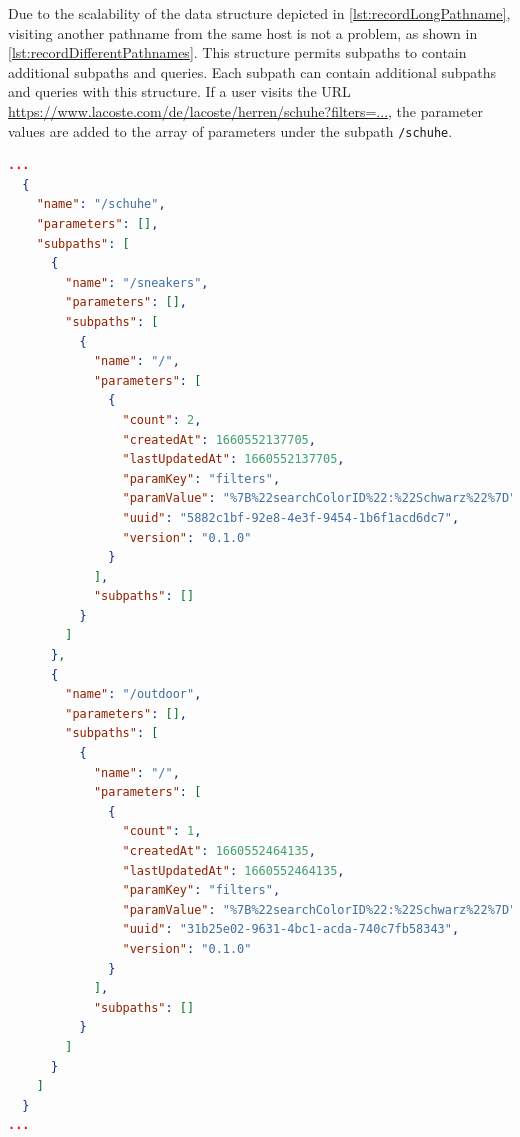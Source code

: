 Due to the scalability of the data structure depicted in \autoref{lst:recordLongPathname}, visiting another pathname from the same host is not a problem, as shown in \autoref{lst:recordDifferentPathnames}. This structure permits subpaths to contain additional subpaths and queries. Each subpath can contain additional subpaths and queries with this structure. If a user visits the URL \url{https://www.lacoste.com/de/lacoste/herren/schuhe?filters=...}, the parameter values are added to the array of parameters under the subpath \texttt{/schuhe}.

\begin{lstlisting}[language=json, caption={Record with different path names (JSON)}, label={lst:recordDifferentPathnames}]
...
  {
    "name": "/schuhe",
    "parameters": [],
    "subpaths": [
      {
        "name": "/sneakers",
        "parameters": [],
        "subpaths": [
          {
            "name": "/",
            "parameters": [
              {
                "count": 2,
                "createdAt": 1660552137705,
                "lastUpdatedAt": 1660552137705,
                "paramKey": "filters",
                "paramValue": "%7B%22searchColorID%22:%22Schwarz%22%7D",
                "uuid": "5882c1bf-92e8-4e3f-9454-1b6f1acd6dc7",
                "version": "0.1.0"
              }
            ],
            "subpaths": []
          }
        ]
      },
      {
        "name": "/outdoor",
        "parameters": [],
        "subpaths": [
          {
            "name": "/",
            "parameters": [
              {
                "count": 1,
                "createdAt": 1660552464135,
                "lastUpdatedAt": 1660552464135,
                "paramKey": "filters",
                "paramValue": "%7B%22searchColorID%22:%22Schwarz%22%7D",
                "uuid": "31b25e02-9631-4bc1-acda-740c7fb58343",
                "version": "0.1.0"
              }
            ],
            "subpaths": []
          }
        ]
      }
    ]
  }
...
\end{lstlisting}

